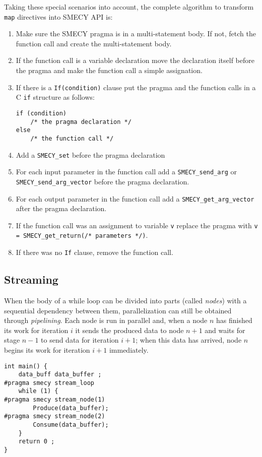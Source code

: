 \documentclass [A4]{article}
\begin{document}
	Taking these special scenarios into account, the complete algorithm to transform \verb+map+ directives into SMECY API is:
	\begin{enumerate}
		\item Make sure the SMECY pragma is in a multi-statement body. If not, fetch the function call and create the multi-statement body.
		\item If the function call is a variable declaration move the declaration itself before the pragma and make the function call a simple assignation.
		\item If there is a \verb+If(condition)+ clause put the pragma and the function calls in a C \verb+if+ structure as follows:
		\begin{lstlisting}[frame=none, numbers=none]
if (condition)
	/* the pragma declaration */
else
	/* the function call */
		\end{lstlisting}
		\item Add a \verb+SMECY_set+ before the pragma declaration
		\item For each input parameter in the function call add a \verb+SMECY_send_arg+ or \verb+SMECY_send_arg_vector+ before the pragma declaration.
		\item For each output parameter in the function call add a \verb+SMECY_get_arg_vector+ after the pragma declaration.
		\item If the function call was an assignment to variable \verb+v+ replace the pragma with \verb+v = SMECY_get_return(/* parameters */)+.
		\item If there was no \verb+If+ clause, remove the function call.
	\end{enumerate}

	\subsection{Streaming}
	When the body of a while loop can be divided into parts (called \emph{nodes}) with a sequential dependency between them, parallelization can still be obtained through \emph{pipelining}. Each node is run in parallel and, when a node $n$ has finished its work for iteration $i$ it sends the produced data to node $n+1$ and waits for stage $n-1$ to send data for iteration $i+1$; when this data has arrived, node $n$ begins its work for iteration $i+1$ immediately.
	
	\begin{lstlisting}[label=streaminput,caption={Input code with streaming pragmas. Definitions of functions \texttt{Produce} and \texttt{Consume} are not shown.}]
int main() {
	data_buff data_buffer ;
#pragma smecy stream_loop
	while (1) {
#pragma smecy stream_node(1)
		Produce(data_buffer);
#pragma smecy stream_node(2)
		Consume(data_buffer);
	}
	return 0 ;
}
	\end{lstlisting}
	
\end{document}
